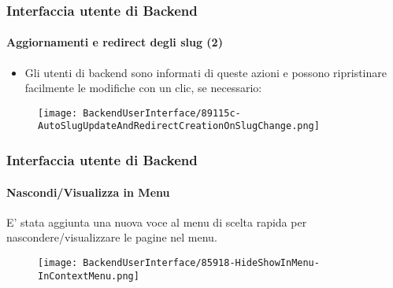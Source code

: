
\begin{frame}[fragile]
	\frametitle{Interfaccia utente di Backend}
	\framesubtitle{Aggiornamenti e redirect degli slug (2)}

	\begin{itemize}
		\item Gli utenti di backend sono informati di queste azioni e possono
			ripristinare facilmente le modifiche con un clic, se necessario:

	\end{itemize}

	\begin{figure}
		\texttt{[image: BackendUserInterface/89115c-AutoSlugUpdateAndRedirectCreationOnSlugChange.png]}
	\end{figure}

\end{frame}


\begin{frame}[fragile]
	\frametitle{Interfaccia utente di Backend}
	\framesubtitle{Nascondi/Visualizza in Menu}

	E' stata aggiunta una nuova voce al menu di scelta rapida per nascondere/visualizzare le pagine nel menu.

	\begin{figure}
		\texttt{[image: BackendUserInterface/85918-HideShowInMenu-InContextMenu.png]}
	\end{figure}

\end{frame}


